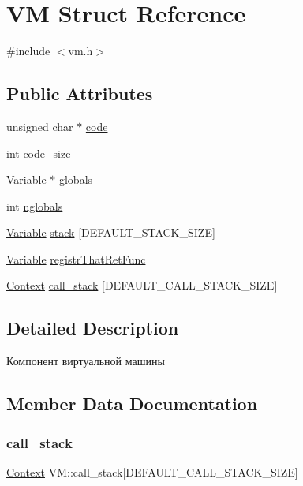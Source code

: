 \hypertarget{struct_v_m}{}\section{VM Struct Reference}
\label{struct_v_m}


{\ttfamily \#include $<$vm.\+h$>$}

\subsection*{Public Attributes}
\begin{DoxyCompactItemize}
\item 
unsigned char $\ast$ \hyperlink{struct_v_m_a760a936633eb5c7b8de120b5d78f9ba6}{code}
\item 
int \hyperlink{struct_v_m_aa5f1f79d48c3a3512a232000f3eb4c26}{code\+\_\+size}
\item 
\hyperlink{union_variable}{Variable} $\ast$ \hyperlink{struct_v_m_a5a38d2d0aa60e11d8138fff312efb926}{globals}
\item 
int \hyperlink{struct_v_m_a68946a4843ec05f3c865d177fa982dbe}{nglobals}
\item 
\hyperlink{union_variable}{Variable} \hyperlink{struct_v_m_a3a031323e2030d712c26dd8f0c79f637}{stack} \mbox{[}D\+E\+F\+A\+U\+L\+T\+\_\+\+S\+T\+A\+C\+K\+\_\+\+S\+I\+ZE\mbox{]}
\item 
\hyperlink{union_variable}{Variable} \hyperlink{struct_v_m_ac82f634bd85dcf9e68f615462f728b55}{registr\+That\+Ret\+Func}
\item 
\hyperlink{struct_context}{Context} \hyperlink{struct_v_m_ac4bacd79fc85e6a75477292f2dfd3707}{call\+\_\+stack} \mbox{[}D\+E\+F\+A\+U\+L\+T\+\_\+\+C\+A\+L\+L\+\_\+\+S\+T\+A\+C\+K\+\_\+\+S\+I\+ZE\mbox{]}
\end{DoxyCompactItemize}


\subsection{Detailed Description}
Компонент виртуальной машины 

\subsection{Member Data Documentation}
\mbox{\label{struct_v_m_ac4bacd79fc85e6a75477292f2dfd3707}} 
\subsubsection{\texorpdfstring{call\+\_\+stack}{call\_stack}}
{\footnotesize\ttfamily \hyperlink{struct_context}{Context} V\+M\+::call\+\_\+stack\mbox{[}D\+E\+F\+A\+U\+L\+T\+\_\+\+C\+A\+L\+L\+\_\+\+S\+T\+A\+C\+K\+\_\+\+S\+I\+ZE\mbox{]}}

